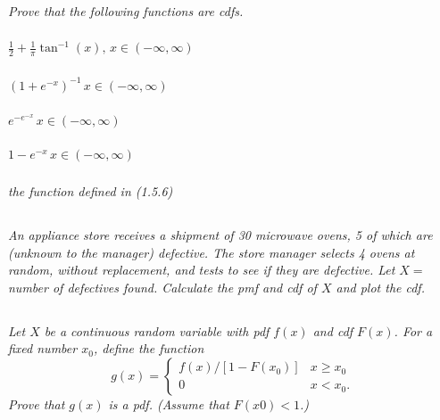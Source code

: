 \documentclass[12pt]{amsart}
\begin{document}
\setcounter{subsection}{46}
\subsection{} %
\textit{Prove that the following functions are cdfs.}
	\subsubsection{} \( \frac{1}{2}+\frac{1}{\pi} \tan^{-1}(x),\, x\in(-\infty,\infty) \)
	\subsubsection{} \( (1+e^{-x})^{-1}\, x\in(-\infty,\infty) \)
	\subsubsection{} \( e^{-e^{-x}}\, x\in(-\infty,\infty) \)
	\subsubsection{} \( 1-e^{-x}\, x\in(-\infty,\infty) \)
	\subsubsection{} \textit{the function defined in (1.5.6)}

\setcounter{subsection}{50}
\subsection{} %
\textit{An appliance store receives a shipment of 30 microwave ovens, 5 of which are (unknown
	to the manager) defective. The store manager selects 4 ovens at random, without
	replacement, and tests to see if they are defective. Let \(X =\) number of defectives
	found. Calculate the pmf and cdf of \(X\) and plot the cdf.}


\subsection{} %
\textit{Let \(X\) be a continuous random variable with pdf \(f(x)\) and cdf \(F(x)\). For a fixed number \(x_0\), define the function
	\[g(x) = \begin{cases}
		f(x)/[1 − F(x_0)] & x\geq x_0 \\
		0 & x < x_0.
	\end{cases} \]
	Prove that \(g(x)\) is a pdf. (Assume that \(F(x0) < 1\).)}
\end{document}
